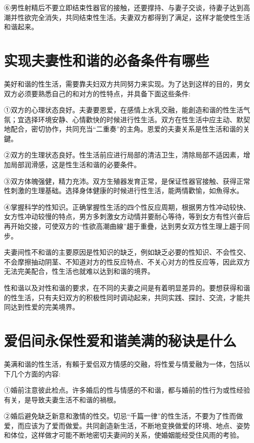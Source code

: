 \documentclass[12pt,UTF8]{ctexbook}
\begin{document}
⑥男性射精后不要立即结束性器官的接触，还要撑持、与妻子交谈，待妻子达到高潮并性欲完全消失，共同结束性生活。夫妻双方都得到了满足，这样才能使性生活和谐起来。

\section{实现夫妻性和谐的必备条件有哪些}

美好和谐的性生活，需要靠夫妇双方共同努力来实现。为了达到这样的目的，男女双方必须要熟悉自己的和对方的性特点，并具备下面这些条件:

①双方的心理状态良好。夫妻要恩爱，在感情上水乳交融，能創造和谐的性生活气氛；宜选择环境安静、心情歡快的时候进行性生活。双方在性生活中应主动、默契地配合，密切协作，共同充当“二重奏”的主角。恩爱的夫妻关系是性生活和谐的关鍵。

②双方的生理状态良好。性生活前应进行局部的清洁卫生，清除局部不适因素，增加局部润滑感，这是性生活和谐的必要条件。

③双方体魄强健，精力充沛。双方生殖器发育正常，是保证性器官接触、获得正常性刺激的生理基础。选择身体健康的时候进行性生活，能两情歡愉，如魚得水。

④掌握科学的性知识。正确掌握性生活的四个性反应周期，根据男方性冲动较快、女方性冲动较慢的特点，男方多刺激女方动情并要耐心等待，等到女方有性兴奋后再开始交接，可使双方的“性欲高潮曲線”趨于重疊，达到男女双方性生理上趨于同步。

夫妻间性不和谐的主要原因是性知识的缺乏，例如缺乏必要的性知识、不会性交、不会摩擦抽动阴茎、不知道对方的性反应特点、不关心对方的性反应等，因此双方无法完美配合，性生活也就难以达到和谐的境界。

性和谐以及对性和谐的要求，在不同的夫妻之间是有着明显差异的。要想获得和谐的性生活，只有夫妇双方的积极性同时调动起来，共同实践、探討、交流，才能共同达到性爱的完美境界。

\section{爱侣间永保性爱和谐美满的秘诀是什么}

美满和谐的性生活，有賴于爱侣双方情感的交融，将性爱与情爱融为一体，包括以下几个方面的内容:

①婚前注意彼此检点。许多婚后的性与情感的不和谐，都与婚前的性行为或性经验有关，是导致夫妻生活不和谐的禍根。

②婚后避免缺乏新意和激情的性交。切忌“千篇一律”的性生活，不要为了性而做爱，而应该为了爱而做爱。共同創造新生活，不断地变换做爱的环境、地点、姿势和体位，这样做才可能不断地密切夫妻间的关系，使婚姻能经受住风雨的考验。
\end{document}
